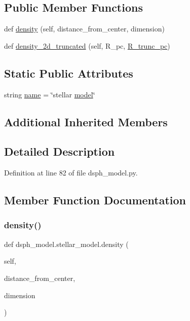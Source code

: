 \subsection*{Public Member Functions}
\begin{DoxyCompactItemize}
\item 
def \hyperlink{classdsph__model_1_1stellar__model_a9a444748be87bd42c8a6e0c4e6b6de43}{density} (self, distance\+\_\+from\+\_\+center, dimension)
\item 
def \hyperlink{classdsph__model_1_1stellar__model_acde2267ff0b15d0177b5eef57fd006ed}{density\+\_\+2d\+\_\+truncated} (self, R\+\_\+pc, \hyperlink{namespacedsph__model_a03ec56ecf56f64e59a6be020a76a36f1}{R\+\_\+trunc\+\_\+pc})
\end{DoxyCompactItemize}
\subsection*{Static Public Attributes}
\begin{DoxyCompactItemize}
\item 
string \hyperlink{classdsph__model_1_1stellar__model_a96f64415fa962d0eda886a7ec575b2b3}{name} = \char`\"{}stellar \hyperlink{classdsph__model_1_1model}{model}\char`\"{}
\end{DoxyCompactItemize}
\subsection*{Additional Inherited Members}


\subsection{Detailed Description}


Definition at line 82 of file dsph\+\_\+model.\+py.



\subsection{Member Function Documentation}
\mbox{\label{classdsph__model_1_1stellar__model_a9a444748be87bd42c8a6e0c4e6b6de43}} 
\subsubsection{\texorpdfstring{density()}{density()}}
{\footnotesize\ttfamily def dsph\+\_\+model.\+stellar\+\_\+model.\+density (\begin{DoxyParamCaption}\item[{}]{self,  }\item[{}]{distance\+\_\+from\+\_\+center,  }\item[{}]{dimension }\end{DoxyParamCaption})}



